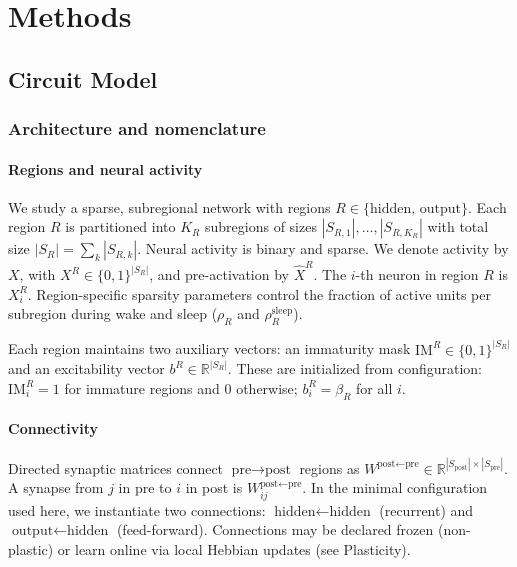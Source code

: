 \documentclass{article}
\begin{document}
\section*{Methods}\label{methods}

\subsection*{Circuit Model}
\subsubsection*{Architecture and nomenclature}
\paragraph*{Regions and neural activity}
We study a sparse, subregional network with regions $R \in \{\text{hidden},\, \text{output}\}$. Each region $R$ is partitioned into $K_R$ subregions of sizes $|S_{R,1}|,\dots,|S_{R,K_R}|$ with total size $|S_R|=\sum_k |S_{R,k}|$. Neural activity is binary and sparse. We denote activity by $X$, with $X^R \in \{0,1\}^{|S_R|}$, and pre-activation by $\hat{X}^R$. The $i$-th neuron in region $R$ is $X^R_i$. Region-specific sparsity parameters control the fraction of active units per subregion during wake and sleep ($\rho_R$ and $\rho_R^{\text{sleep}}$).

Each region maintains two auxiliary vectors: an immaturity mask $\mathrm{IM}^R \in \{0,1\}^{|S_R|}$ and an excitability vector $b^R \in \mathbb{R}^{|S_R|}$. These are initialized from configuration: $\mathrm{IM}^R_i=1$ for immature regions and $0$ otherwise; $b^R_i = \beta_R$ for all $i$.

\paragraph*{Connectivity}
Directed synaptic matrices connect $\textrm{pre}\to\textrm{post}$ regions as $W^{\textrm{post}\leftarrow\textrm{pre}} \in \mathbb{R}^{|S_{\textrm{post}}|\times|S_{\textrm{pre}}|}$. A synapse from $j$ in pre to $i$ in post is $W^{\textrm{post}\leftarrow\textrm{pre}}_{ij}$. In the minimal configuration used here, we instantiate two connections: $\text{hidden}\leftarrow\text{hidden}$ (recurrent) and $\text{output}\leftarrow\text{hidden}$ (feed-forward). Connections may be declared frozen (non-plastic) or learn online via local Hebbian updates (see Plasticity).
\end{document}
